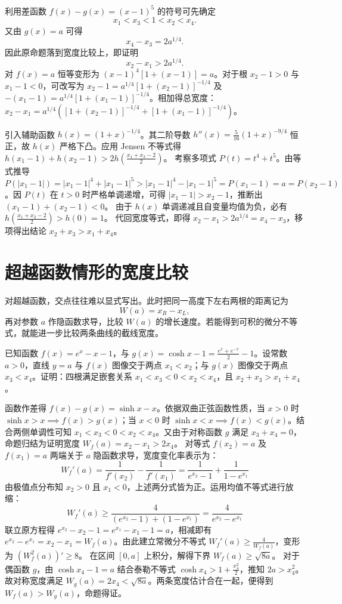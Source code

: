 \begin{solution}
利用差函数 $f(x) - g(x) = (x-1)^5$ 的符号可先确定
\[
x_1 < x_3 < 1 < x_2 < x_4.
\]
又由 $g(x) = a$ 可得
\[
x_4 - x_3 = 2a^{1/4}.
\]
因此原命题落到宽度比较上，即证明
\[
x_2 - x_1 > 2a^{1/4}.
\]
对 $f(x)=a$ 恒等变形为 $(x-1)^4[1 + (x-1)] = a$。对于根 $x_2-1 > 0$ 与 $x_1-1 < 0$，可改写为 $x_2-1 = a^{1/4}[1 + (x_2-1)]^{-1/4}$ 及 $-(x_1-1) = a^{1/4}[1 + (x_1-1)]^{-1/4}$。相加得总宽度：$x_2 - x_1 = a^{1/4} \left( [1 + (x_2-1)]^{-1/4} + [1 + (x_1-1)]^{-1/4} \right)$。

引入辅助函数 $h(x) = (1+x)^{-1/4}$。其二阶导数 $h''(x) = \frac{5}{16}(1+x)^{-9/4}$ 恒正，故 $h(x)$ 严格下凸。应用 Jensen 不等式得 $h(x_1-1) + h(x_2-1) > 2 h\left(\frac{x_1+x_2-2}{2}\right)$。
考察多项式 $P(t) = t^4 + t^5$。由等式推导 $P(|x_1-1|) = |x_1-1|^4 + |x_1-1|^5 > |x_1-1|^4 - |x_1-1|^5 = P(x_1-1) = a = P(x_2-1)$。因 $P(t)$ 在 $t > 0$ 时严格单调递增，可得 $|x_1-1| > x_2-1$，推断出 $(x_1-1) + (x_2-1) < 0$。
由于 $h(x)$ 单调递减且自变量均值为负，必有 $h\left(\frac{x_1+x_2-2}{2}\right) > h(0) = 1$。
代回宽度等式，即得 $x_2 - x_1 > 2a^{1/4} = x_4 - x_3$，移项得出结论 $x_2 + x_3 > x_1 + x_4$。
\end{solution}

\section{超越函数情形的宽度比较}

对超越函数，交点往往难以显式写出。此时把同一高度下左右两根的距离记为
\[
W(a)=x_R-x_L,
\]
再对参数 $a$ 作隐函数求导，比较 $W(a)$ 的增长速度。若能得到可积的微分不等式，就能进一步比较两条曲线的截线宽度。

\begin{example}
已知函数 $f(x) = e^x - x - 1$，与 $g(x) = \cosh x - 1 = \frac{e^x + e^{-x}}{2} - 1$。设常数 $a > 0$，直线 $y=a$ 与 $f(x)$ 图像交于两点 $x_1 < x_2$；与 $g(x)$ 图像交于两点 $x_3 < x_4$。证明：四根满足嵌套关系 $x_1 < x_3 < 0 < x_2 < x_4$，且 $x_2 + x_3 > x_1 + x_4$。
\end{example}

\begin{solution}
函数作差得 $f(x) - g(x) = \sinh x - x$。依据双曲正弦函数性质，当 $x>0$ 时 $\sinh x > x \implies f(x)>g(x)$；当 $x<0$ 时 $\sinh x < x \implies f(x)<g(x)$。结合两侧单调性可知 $x_1 < x_3 < 0 < x_2 < x_4$。又由于对称函数 $g$ 满足 $x_3 + x_4 = 0$，命题归结为证明宽度 $W_f(a) = x_2 - x_1 > 2x_4$。
对等式 $f(x_2)=a$ 及 $f(x_1)=a$ 两端关于 $a$ 隐函数求导，宽度变化率表示为：
$$ W_f'(a) = \frac{1}{f'(x_2)} - \frac{1}{f'(x_1)} = \frac{1}{e^{x_2}-1} + \frac{1}{1-e^{x_1}} $$
由极值点分布知 $x_2>0$ 且 $x_1<0$，上述两分式皆为正。运用均值不等式进行放缩：
$$ W_f'(a) \ge \frac{4}{(e^{x_2}-1) + (1-e^{x_1})} = \frac{4}{e^{x_2} - e^{x_1}} $$
联立原方程得 $e^{x_2}-x_2-1 = e^{x_1}-x_1-1 = a$，相减即有 $e^{x_2}-e^{x_1} = x_2-x_1 = W_f(a)$。由此建立常微分不等式 $W_f'(a) \ge \frac{4}{W_f(a)}$，变形为 $(W_f^2(a))' \ge 8$。
在区间 $[0, a]$ 上积分，解得下界 $W_f(a) \ge \sqrt{8a}$。
对于偶函数 $g$，由 $\cosh x_4 - 1 = a$ 结合泰勒不等式 $\cosh x_4 > 1 + \frac{x_4^2}{2}$，推知 $2a > x_4^2$。故对称宽度满足 $W_g(a) = 2x_4 < \sqrt{8a}$。两条宽度估计合在一起，便得到 $W_f(a) > W_g(a)$，命题得证。
\end{solution}

